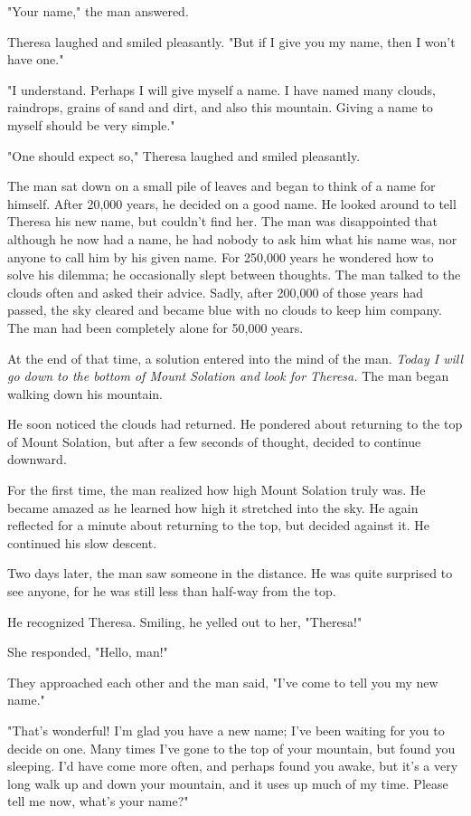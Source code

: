 "Your name," the man answered.

Theresa laughed and smiled pleasantly. "But if I give you my name, then I won't have one."

"I understand. Perhaps I will give myself a name. I have named many clouds, raindrops, grains of sand and dirt, and also this mountain. Giving a name to myself should be very simple."

"One should expect so," Theresa laughed and smiled pleasantly.

The man sat down on a small pile of leaves and began to think of a name for himself. After 20,000 years, he decided on a good name. He looked around to tell Theresa his new name, but couldn't find her. The man was disappointed that although he now had a name, he had nobody to ask him what his name was, nor anyone to call him by his given name. For 250,000 years he wondered how to solve his dilemma; he occasionally slept between thoughts. The man talked to the clouds often and asked their advice. Sadly, after 200,000 of those years had passed, the sky cleared and became blue with no clouds to keep him company. The man had been completely alone for 50,000 years.

At the end of that time, a solution entered into the mind of the man. \textit{Today I will go down to the bottom of Mount Solation and look for Theresa.} The man began walking down his mountain.

He soon noticed the clouds had returned. He pondered about returning to the top of Mount Solation, but after a few seconds of thought, decided to continue downward.

For the first time, the man realized how high Mount Solation truly was. He  became amazed as he learned how high it stretched into the sky. He again reflected for a minute about returning to the top, but decided against it. He continued his slow descent.

Two days later, the man saw someone in the distance. He was quite surprised to see anyone, for he was still less than half-way from the top.

He recognized Theresa. Smiling, he yelled out to her, "Theresa!"

She responded, "Hello, man!"

They approached each other and the man said, "I've come to tell you my new name."

"That's wonderful! I'm glad you have a new name; I've been waiting for you to decide on one. Many times I've gone to the top of your mountain, but found you sleeping. I'd have come more often, and perhaps found you awake, but it's a very long walk up and down your mountain, and it uses up much of my time. Please tell me now, what's your name?"

